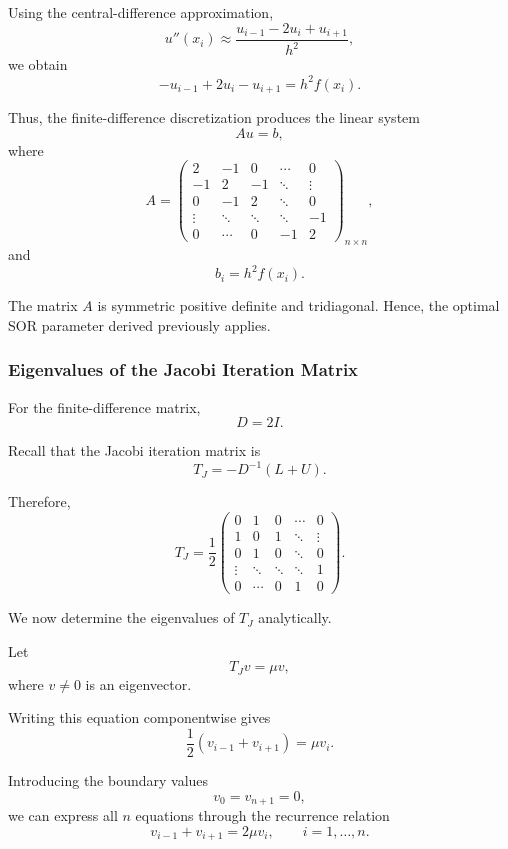 \documentclass[11pt,a4paper]{article}
\theoremstyle{definition}
\theoremstyle{remark}
\begin{document}
Using the central-difference approximation,
\[
    u''(x_i)
    \approx
    \frac{u_{i-1}-2u_i+u_{i+1}}{h^2},
\]
we obtain
\[
    -u_{i-1}+2u_i-u_{i+1}
    =
    h^2f(x_i).
\]

Thus, the finite-difference discretization
produces the linear system
\[
    Au=b,
\]
where
\[
    A=
    \begin{pmatrix}
    2 & -1 & 0 & \cdots & 0\\
    -1 & 2 & -1 & \ddots & \vdots\\
    0 & -1 & 2 & \ddots & 0\\
    \vdots & \ddots & \ddots & \ddots & -1\\
    0 & \cdots & 0 & -1 & 2
    \end{pmatrix}_{n\times n},
\]
and
\[
    b_i=h^2f(x_i).
\]

The matrix $A$ is symmetric positive definite
and tridiagonal. Hence, the optimal SOR
parameter derived previously applies.


\subsubsection*{Eigenvalues of the Jacobi Iteration Matrix}

For the finite-difference matrix,
\[
    D=2I.
\]

Recall that the Jacobi iteration matrix is
\[
    T_J=-D^{-1}(L+U).
\]

Therefore,
\[
    T_J=
    \frac12
    \begin{pmatrix}
    0 & 1 & 0 & \cdots & 0\\
    1 & 0 & 1 & \ddots & \vdots\\
    0 & 1 & 0 & \ddots & 0\\
    \vdots & \ddots & \ddots & \ddots & 1\\
    0 & \cdots & 0 & 1 & 0
    \end{pmatrix}.
\]

We now determine the eigenvalues of $T_J$
analytically.

Let
\[
    T_Jv=\mu v,
\]
where $v\neq0$ is an eigenvector.

Writing this equation componentwise gives
\[
    \frac12(v_{i-1}+v_{i+1})
    =
    \mu v_i.
\]

Introducing the boundary values
\[
    v_0=v_{n+1}=0,
\]
we can express all $n$ equations through
the recurrence relation
\begin{equation}
    v_{i-1}+v_{i+1}
    =
    2\mu v_i,
    \qquad i=1,\ldots,n.
    \label{eq:jacobi_eigenvector_recurrence}
\end{equation}
\end{document}
